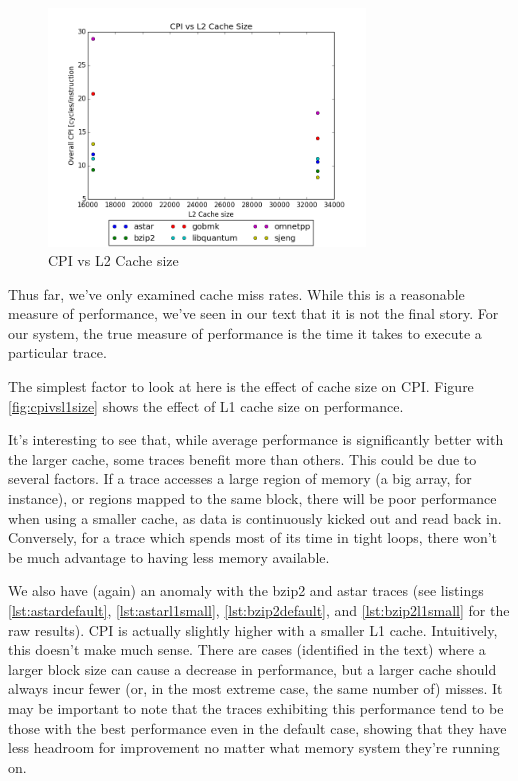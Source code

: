 \documentclass{article}
\begin{document}
\begin{figure}[ht]
    \centering
    \includegraphics[width=0.75\textwidth]{plots/CPI_vs_L2Cache_size.png}
    \caption{CPI vs L2 Cache size}
    \label{fig:cpivsl2size}
\end{figure}

Thus far, we've only examined cache miss rates. While this is a reasonable
measure of performance, we've seen in our text that it is not the final story.
For our system, the true measure of performance is the time it takes to execute
a particular trace.

The simplest factor to look at here is the effect of cache size on CPI. Figure
\ref{fig:cpivsl1size} shows the effect of L1 cache size on performance.

It's interesting to see that, while average performance is significantly better
with the larger cache, some traces benefit more than others. This could be due
to several factors. If a trace accesses a large region of memory (a big array,
for instance), or regions mapped to the same block, there will be poor
performance when using a smaller cache, as data is continuously kicked out and
read back in. Conversely, for a trace which spends most of its time in tight
loops, there won't be much advantage to having less memory available.

We also have (again) an anomaly with the bzip2 and astar traces (see listings
\ref{lst:astardefault}, \ref{lst:astarl1small},
\ref{lst:bzip2default}, and \ref{lst:bzip2l1small} for the raw results). CPI is
actually slightly higher with a smaller L1 cache. Intuitively, this doesn't make
much sense. There are cases (identified in the text) where a larger block size
can cause a decrease in performance, but a larger cache should always incur
fewer (or, in the most extreme case, the same number of) misses. It may be
important to note that the traces exhibiting this performance tend to be those
with the best performance even in the default case, showing that they have less
headroom for improvement no matter what memory system they're running on.
\end{document}
